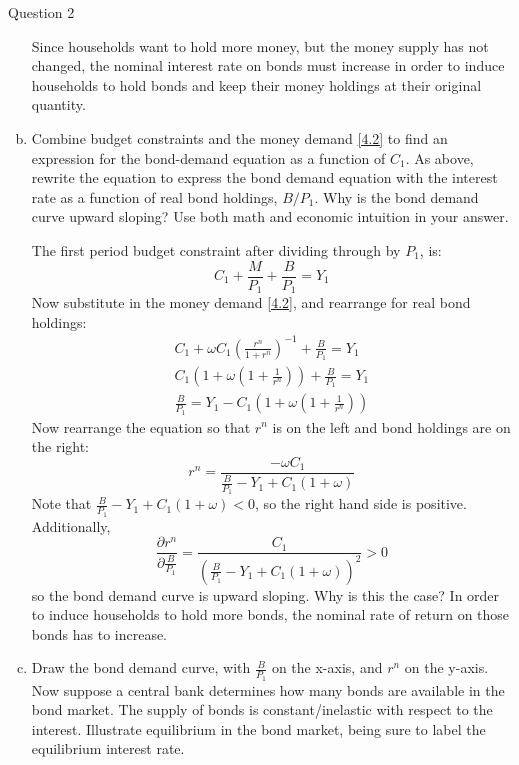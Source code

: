 \documentclass[a4paper]{article}
\begin{document}
\begin{questionbox}{Question 2}
\begin{enumerate}[(a)]
\begin{explanationbox}
\begin{figure}[H]
				\end{figure}
				Since households want to hold more money, but the money supply has not changed, the nominal interest rate on bonds must increase in order to induce households to hold bonds and keep their money holdings at their original quantity.
			\end{explanationbox}
			\item Combine budget constraints and the money demand \cref{4.2} to find an expression for the bond-demand equation as a function of \( C_1 \). As above, rewrite the equation to express the bond demand equation with the interest rate as a function of real bond holdings, \( B/P_1 \). Why is the bond demand curve upward sloping? Use both math and economic intuition in your answer.
			\begin{explanationbox}
				The first period budget constraint after dividing through by \( P_1 \), is:
				\[
					C_1 + \frac{M}{P_1} + \frac{B}{P_1} = Y_1
				\]
				Now substitute in the money demand \cref{4.2}, and rearrange for real bond holdings:
				\begin{align*}
					C_1 + \omega C_1 \left( \frac{r^n}{1+r^n} \right)^{-1} + \frac{B}{P_1} = Y_1\\
					C_1 \left( 1 + \omega \left( 1 + \frac{1}{r^n} \right) \right) + \frac{B}{P_1} = Y_1\\
					\frac{B}{P_1} = Y_1 - C_1 \left( 1 + \omega \left( 1 + \frac{1}{r^n} \right) \right)
				\end{align*}
				Now rearrange the equation so that \( r^n \) is on the left and bond holdings are on the right:
				\[
					r^n = \frac{- \omega C_1}{\frac{B}{P_1} - Y_1 + C_1 (1 + \omega)}
				\]
				Note that \( \frac{B}{P_1} - Y_1 + C_1 (1 + \omega) < 0 \), so the right hand side is positive. Additionally,
				\[
					\frac{\partial r^n}{\partial \frac{B}{P_1}} = \frac{C_1}{\left( \frac{B}{P_1} - Y_1 + C_1 (1 + \omega) \right)^2} > 0
				\]
				so the bond demand curve is upward sloping. Why is this the case? In order to induce households to hold more bonds, the nominal rate of return on those bonds has to increase.
			\end{explanationbox}\pagebreak
			\item Draw the bond demand curve, with \( \frac{B}{P_1} \) on the x-axis, and \( r^n \) on the y-axis. Now suppose a central bank determines how many bonds are available in the bond market. The supply of bonds is constant/inelastic with respect to the interest. Illustrate equilibrium in the bond market, being sure to label the equilibrium interest rate.

\end{enumerate}
\end{questionbox}
\end{document}
